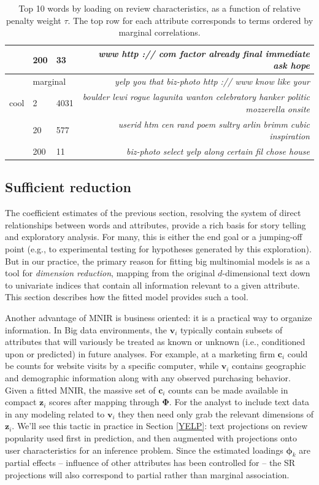 \documentclass[12pt]{article}
\newcommand{\bs}[1]{\boldsymbol{#1}}
\newcommand{\bm}[1]{\mathbf{#1}}
\begin{document}
\begin{table}[b!]
\begin{tabular}{cll|r}
 & 200 & 33 & \footnotesize\it  www http :// com factor already final immediate ask hope \\
\hline
 &  \multicolumn{2}{l|}{marginal}   & \footnotesize\it  yelp you that biz-photo http :// www know like your \\
\small cool & 2 & 4031 & \footnotesize\it  boulder lewi rogue lagunita wanton celebratory hanker politic mozzerella onsite \\
 & 20 & 577 & \footnotesize\it  userid htm cen rand poem sultry arlin brimm cubic inspiration \\
 & 200 & 11 & \footnotesize\it  biz-photo select yelp along certain fil chose house  \\
\hline\end{tabular}
\caption[l]{\label{topwords}
Top 10 words by loading on review characteristics, as a function of relative
penalty weight $\tau$.  The top row for each attribute  corresponds to terms ordered by
marginal correlations.}
\end{table}


\subsection{Sufficient reduction}

The coefficient estimates of the previous section, resolving the system of
direct relationships between words and attributes,  provide a rich basis for
story telling and exploratory analysis. For many, this is either the end goal
or a jumping-off point (e.g., to experimental testing for hypotheses generated
by this exploration).  But in our practice, the primary reason for fitting big
multinomial models is as a tool for {\it dimension reduction}, mapping from
the original $d$-dimensional text down to univariate indices that contain all
information relevant to a given attribute.  This section describes how the fitted model provides such a tool.



Another advantage of MNIR is business oriented: it is a practical way to
organize information.  In Big data environments, the $\bm{v}_i$ typically
contain subsets of attributes that will variously be treated as known or
unknown (i.e., conditioned upon or predicted) in future analyses.  For
example, at a marketing firm $\bm{c}_i$ could be counts for website visits by
a specific computer, while $\bm{v}_i$ contains geographic and demographic
information along with any observed purchasing behavior.
Given a fitted MNIR, the massive set of $\bm{c}_i$ counts can be
made available in compact $\bm{z}_i$ scores after mapping through
$\bs{\Phi}$.  For the analyst to include text data in any modeling related to
$\bm{v}_i$ they then need only grab the relevant dimensions of $\bm{z}_i$.
We'll see this tactic in practice in Section \ref{YELP}:  text
projections on review popularity used first in prediction, and then
augmented with projections onto user characteristics for an inference problem.
Since the estimated loadings $\bs{\phi}_k$ are partial effects --  influence of other attributes has been controlled for -- the SR projections will also correspond to partial rather than marginal association.
\end{document}
